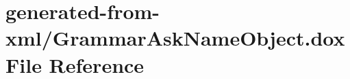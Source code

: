 \hypertarget{GrammarAskNameObject_8dox}{}\section{generated-\/from-\/xml/\+Grammar\+Ask\+Name\+Object.dox File Reference}
\label{GrammarAskNameObject_8dox}
